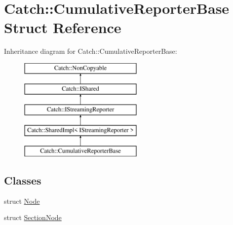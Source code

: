 \hypertarget{struct_catch_1_1_cumulative_reporter_base}{\section{Catch\-:\-:Cumulative\-Reporter\-Base Struct Reference}
\label{struct_catch_1_1_cumulative_reporter_base}
}
Inheritance diagram for Catch\-:\-:Cumulative\-Reporter\-Base\-:\begin{figure}[H]
\begin{center}
\leavevmode
\includegraphics[height=5.000000cm]{struct_catch_1_1_cumulative_reporter_base}
\end{center}
\end{figure}
\subsection*{Classes}
\begin{DoxyCompactItemize}
\item 
struct \hyperlink{struct_catch_1_1_cumulative_reporter_base_1_1_node}{Node}
\item 
struct \hyperlink{struct_catch_1_1_cumulative_reporter_base_1_1_section_node}{Section\-Node}
\end{DoxyCompactItemize}

